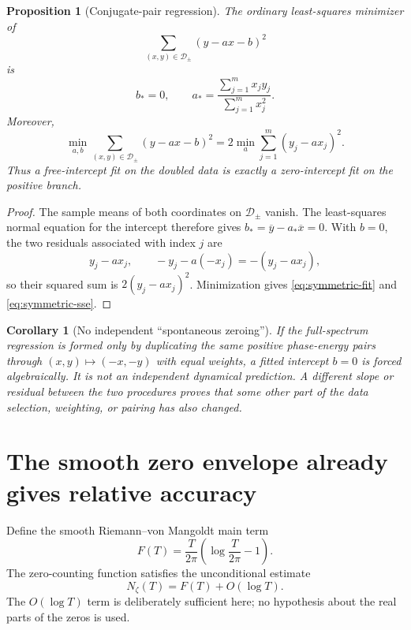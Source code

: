 \documentclass[11pt]{article}
\newtheorem{proposition}[theorem]{Proposition}
\newtheorem{corollary}[theorem]{Corollary}
\theoremstyle{definition}
\theoremstyle{remark}
\begin{document}
\begin{proposition}[Conjugate-pair regression]\label{prop:symmetric-regression}
The ordinary least-squares minimizer of
\[
    \sum_{(x,y)\in\mathcal D_\pm}(y-a x-b)^2
\]
is
\begin{equation}\label{eq:symmetric-fit}
    b_*=0,
    \qquad
    a_*=\frac{\sum_{j=1}^m x_jy_j}{\sum_{j=1}^m x_j^2}.
\end{equation}
Moreover,
\begin{equation}\label{eq:symmetric-sse}
    \min_{a,b}\sum_{(x,y)\in\mathcal D_\pm}(y-a x-b)^2
    =2\min_a\sum_{j=1}^m(y_j-a x_j)^2.
\end{equation}
Thus a free-intercept fit on the doubled data is exactly a zero-intercept fit on the positive branch.
\end{proposition}

\begin{proof}
The sample means of both coordinates on $\mathcal D_\pm$ vanish.  The least-squares normal equation for the intercept therefore gives $b_*=\overline y-a_*\overline x=0$.  With $b=0$, the two residuals associated with index $j$ are
\[
    y_j-a x_j,
    \qquad
    -y_j-a(-x_j)=-(y_j-a x_j),
\]
so their squared sum is $2(y_j-a x_j)^2$.  Minimization gives \eqref{eq:symmetric-fit} and \eqref{eq:symmetric-sse}.
\end{proof}

\begin{corollary}[No independent ``spontaneous zeroing'']\label{cor:zeroing}
If the full-spectrum regression is formed only by duplicating the same positive phase-energy pairs through $(x,y)\mapsto(-x,-y)$ with equal weights, a fitted intercept $b=0$ is forced algebraically.  It is not an independent dynamical prediction.  A different slope or residual between the two procedures proves that some other part of the data selection, weighting, or pairing has also changed.
\end{corollary}

\section{The smooth zero envelope already gives relative accuracy}\label{sec:envelope}

Define the smooth Riemann--von Mangoldt main term
\begin{equation}\label{eq:F-def}
    F(T)=\frac{T}{2\pi}\left(\log\frac{T}{2\pi}-1\right).
\end{equation}
The zero-counting function satisfies the unconditional estimate \citep{Titchmarsh1986,Edwards1974}
\begin{equation}\label{eq:RVM}
    N_\zeta(T)=F(T)+O(\log T).
\end{equation}
The $O(\log T)$ term is deliberately sufficient here; no hypothesis about the real parts of the zeros is used.
\end{document}

